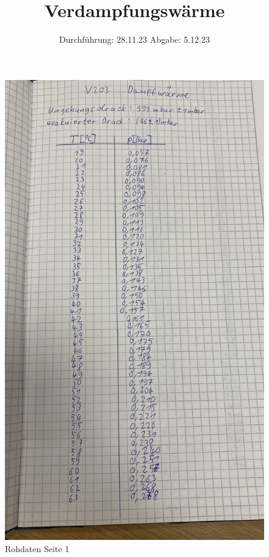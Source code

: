 

\subject{V203}
\title{Verdampfungswärme}
\date{%
  Durchführung: 28.11.23
  \hspace{3em}
  Abgabe: 5.12.23
}



\maketitle
\thispagestyle{empty}
\tableofcontents
\newpage






\printbibliography{}

\begin{figure}
  \centering
  \includegraphics[width=\textwidth, angle=270]{Bilder/data1.jpg}
  \caption{Rohdaten Seite 1}
  \label{fig:Data1}
\end{figure}
